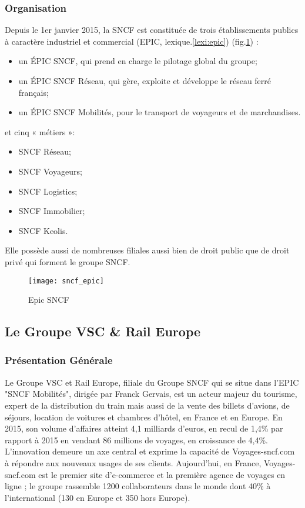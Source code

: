 \subsubsection{Organisation}
Depuis le 1er janvier 2015,
la SNCF est constituée de trois établissements publics à caractère industriel et commercial (EPIC, lexique.\ref{lexi:epic}) (fig.\ref{fig:sncf_epic}) :

\begin{itemize}
 \item un ÉPIC SNCF, qui prend en charge le pilotage global du groupe;
 \item un ÉPIC SNCF Réseau, qui gère, exploite et développe le réseau ferré français;
 \item un ÉPIC SNCF Mobilités, pour le transport de voyageurs et de marchandises.
\end{itemize}
et cinq « métiers »:
\begin{itemize}
 \item SNCF Réseau;
 \item SNCF Voyageurs;
 \item SNCF Logistics;
 \item SNCF Immobilier;
 \item SNCF Keolis.
\end{itemize}

Elle possède aussi de nombreuses filiales aussi bien de droit public que de droit privé qui forment le groupe SNCF.

\begin{figure}[ht]
 \centering
 \texttt{[image: sncf\_epic]}
 \caption{Epic SNCF}
 \label{fig:sncf_epic}
\end{figure}

\subsection{Le Groupe VSC \& Rail Europe}
\subsubsection{Présentation Générale}

Le Groupe VSC et Rail Europe, filiale du Groupe SNCF qui se situe dans l'EPIC "SNCF Mobilités", dirigée par Franck Gervais, est un acteur majeur du tourisme, expert de la distribution du train mais aussi de la vente des billets d'avions, de séjours, location de voitures et chambres d'hôtel, en France et en Europe. En 2015, son volume d’affaires atteint 4,1 milliards d’euros, en recul de 1,4\% par rapport à 2015 en vendant 86 millions de voyages, en croissance de 4,4\%. L’innovation demeure un axe central et exprime la capacité de Voyages-sncf.com à répondre aux nouveaux usages de ses clients. Aujourd’hui, en France, Voyages-sncf.com est le premier site d’e-commerce et la première agence de voyages en ligne ; le groupe rassemble 1200 collaborateurs dans le monde dont 40\% à l'international (130 en Europe et 350 hors Europe).

